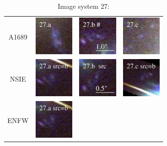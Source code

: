 \documentclass[useAMS,usenatbib]{mn2e}
\begin{document}
\begin{table}
  \caption{Image system 27:}\vspace{0mm}
  \begin{tabular}{cccc}
    \multicolumn{1}{m{1cm}}{{\Large A1689}}
    & \multicolumn{1}{m{1.7cm}}{\includegraphics[height=2.00cm,clip]{figs/nsie_img/rgb.img_27_a.ps}}
    & \multicolumn{1}{m{1.7cm}}{\includegraphics[height=2.00cm,clip]{figs/nsie_img/rgb.img_27_b.ps}}
    & \multicolumn{1}{m{1.7cm}}{\includegraphics[height=2.00cm,clip]{figs/nsie_img/rgb.img_27_c.ps}} \\
    \multicolumn{1}{m{1cm}}{{\Large NSIE}}
    & \multicolumn{1}{m{1.7cm}}{\includegraphics[height=2.00cm,clip]{figs/nsie_img/rgb.pre_27_a_b_tri.ps}}
    & \multicolumn{1}{m{1.7cm}}{\includegraphics[height=2.00cm,clip]{figs/nsie_img/rgb.src_27_b.ps}}
    & \multicolumn{1}{m{1.7cm}}{\includegraphics[height=2.00cm,clip]{figs/nsie_img/rgb.pre_27_c_b_tri.ps}} \\
    \multicolumn{1}{m{1cm}}{{\Large ENFW}}
    & \multicolumn{1}{m{1.7cm}}{\includegraphics[height=2.00cm,clip]{figs/enfw_img/rgb.pre_27_a_b_tri.ps}}

\end{tabular}
\end{table}
\end{document}
